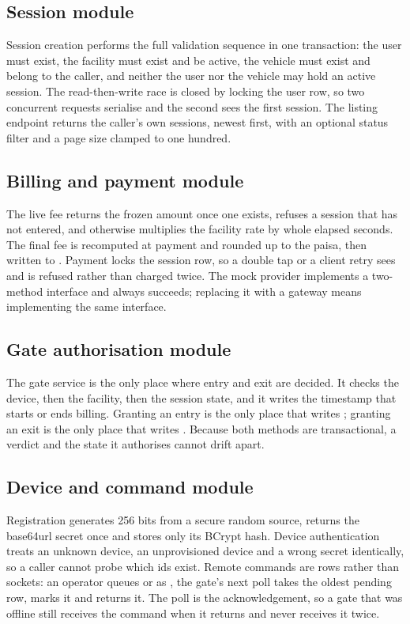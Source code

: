 \subsection{Session module}

Session creation performs the full validation sequence in one transaction: the user
must exist, the facility must exist and be active, the vehicle must exist and belong
to the caller, and neither the user nor the vehicle may hold an active session. The
read-then-write race is closed by locking the user row, so two concurrent requests
serialise and the second sees the first session. The listing endpoint returns the
caller's own sessions, newest first, with an optional status filter and a page size
clamped to one hundred.

\subsection{Billing and payment module}

The live fee returns the frozen amount once one exists, refuses a session that has not
entered, and otherwise multiplies the facility rate by whole elapsed seconds. The
final fee is recomputed at payment and rounded up to the paisa, then written to
. Payment locks the session row, so a double tap or a client retry
sees  and is refused rather than charged twice. The mock
provider implements a two-method interface and always succeeds; replacing it with a
gateway means implementing the same interface.

\subsection{Gate authorisation module}

The gate service is the only place where entry and exit are decided. It checks the
device, then the facility, then the session state, and it writes the timestamp that
starts or ends billing. Granting an entry is the only place that writes
; granting an exit is the only place that writes
. Because both methods are transactional, a verdict and the
state it authorises cannot drift apart.

\subsection{Device and command module}

Registration generates 256 bits from a secure random source, returns the base64url
secret once and stores only its BCrypt hash. Device authentication treats an unknown
device, an unprovisioned device and a wrong secret identically, so a caller cannot
probe which ids exist. Remote commands are rows rather than sockets: an operator
queues  or  as , the gate's next poll
takes the oldest pending row, marks it  and returns it. The poll is
the acknowledgement, so a gate that was offline still receives the command when it
returns and never receives it twice.

